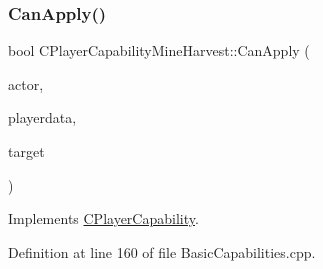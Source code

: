 \subsubsection{\texorpdfstring{Can\+Apply()}{CanApply()}}
{\footnotesize\ttfamily bool C\+Player\+Capability\+Mine\+Harvest\+::\+Can\+Apply (\begin{DoxyParamCaption}\item[{std\+::shared\+\_\+ptr$<$ \hyperlink{classCPlayerAsset}{C\+Player\+Asset} $>$}]{actor,  }\item[{std\+::shared\+\_\+ptr$<$ \hyperlink{classCPlayerData}{C\+Player\+Data} $>$}]{playerdata,  }\item[{std\+::shared\+\_\+ptr$<$ \hyperlink{classCPlayerAsset}{C\+Player\+Asset} $>$}]{target }\end{DoxyParamCaption})\hspace{0.3cm}{\ttfamily [virtual]}}



Implements \hyperlink{classCPlayerCapability_ae96263e0950f496492f8baeb877b9554}{C\+Player\+Capability}.



Definition at line 160 of file Basic\+Capabilities.\+cpp.



